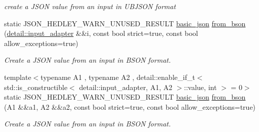 \begin{DoxyCompactItemize}
\begin{DoxyCompactList}\small\item\em create a J\+S\+ON value from an input in U\+B\+J\+S\+ON format \end{DoxyCompactList}\item 
static J\+S\+O\+N\+\_\+\+H\+E\+D\+L\+E\+Y\+\_\+\+W\+A\+R\+N\+\_\+\+U\+N\+U\+S\+E\+D\+\_\+\+R\+E\+S\+U\+LT \mbox{\hyperlink{classnlohmann_1_1basic__json}{basic\+\_\+json}} \mbox{\hyperlink{classnlohmann_1_1basic__json_a0524486cd0b36a47448df882ec0d5e7b}{from\+\_\+bson}} (\mbox{\hyperlink{classnlohmann_1_1detail_1_1input__adapter}{detail\+::input\+\_\+adapter}} \&\&i, const bool strict=true, const bool allow\+\_\+exceptions=true)
\begin{DoxyCompactList}\small\item\em Create a J\+S\+ON value from an input in B\+S\+ON format. \end{DoxyCompactList}\item 
{\footnotesize template$<$typename A1 , typename A2 , detail\+::enable\+\_\+if\+\_\+t$<$ std\+::is\+\_\+constructible$<$ detail\+::input\+\_\+adapter, A1, A2 $>$\+::value, int $>$  = 0$>$ }\\static J\+S\+O\+N\+\_\+\+H\+E\+D\+L\+E\+Y\+\_\+\+W\+A\+R\+N\+\_\+\+U\+N\+U\+S\+E\+D\+\_\+\+R\+E\+S\+U\+LT \mbox{\hyperlink{classnlohmann_1_1basic__json}{basic\+\_\+json}} \mbox{\hyperlink{classnlohmann_1_1basic__json_a000cef9f49c8f04319cf98150361d13d}{from\+\_\+bson}} (A1 \&\&a1, A2 \&\&a2, const bool strict=true, const bool allow\+\_\+exceptions=true)
\begin{DoxyCompactList}\small\item\em Create a J\+S\+ON value from an input in B\+S\+ON format. \end{DoxyCompactList}\end{DoxyCompactItemize}
